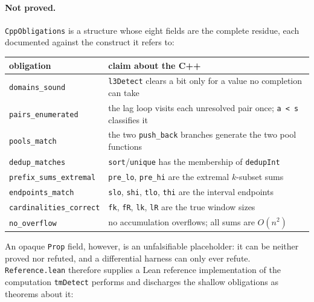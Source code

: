 \documentclass[11pt,a4paper]{article}
\theoremstyle{definition}
\begin{document}
\paragraph{Not proved.} \texttt{CppObligations} is a structure whose eight fields
are the complete residue, each documented against the construct it refers to:

\begin{center}
\begin{tabular}{@{}ll@{}}
\toprule
obligation & claim about the C++ \\
\midrule
\texttt{domains\_sound} & \texttt{l3Detect} clears a bit only for a value no completion can take \\
\texttt{pairs\_enumerated} & the lag loop visits each unresolved pair once; \texttt{a < s} classifies it \\
\texttt{pools\_match} & the two \texttt{push\_back} branches generate the two pool functions \\
\texttt{dedup\_matches} & \texttt{sort}/\texttt{unique} has the membership of \texttt{dedupInt} \\
\texttt{prefix\_sums\_extremal} & \texttt{pre\_lo}, \texttt{pre\_hi} are the extremal $k$-subset sums \\
\texttt{endpoints\_match} & \texttt{slo}, \texttt{shi}, \texttt{tlo}, \texttt{thi} are the interval endpoints \\
\texttt{cardinalities\_correct} & \texttt{fk}, \texttt{fR}, \texttt{lk}, \texttt{lR} are the true window sizes \\
\texttt{no\_overflow} & no accumulation overflows; all sums are $O(n^2)$ \\
\bottomrule
\end{tabular}
\end{center}

\noindent An opaque \texttt{Prop} field, however, is an unfalsifiable
placeholder: it can be neither proved nor refuted, and a differential harness can
only ever refute. \texttt{Reference.lean} therefore supplies a Lean reference
implementation of the computation \texttt{tmDetect} performs and discharges the
shallow obligations as theorems about it:
\end{document}
